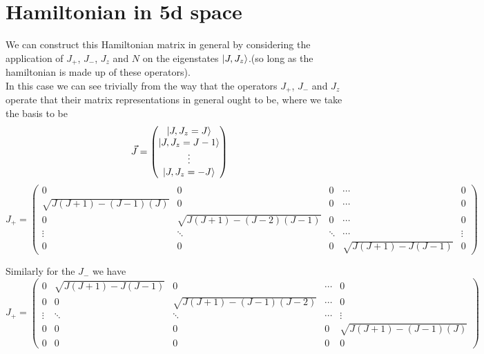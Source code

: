 \documentclass[11pt]{article} %
\begin{document}
\section{Hamiltonian in 5d space}

We can construct this Hamiltonian matrix in general by considering the application of $J_+$, $J_-$, $J_z$ and $N$ on the eigenstates $\ket{J,J_z}$.(so long as the hamiltonian is made up of these operators).\\


In this case we can see trivially from the way that the operators $J_+$, $J_-$ and $J_z$ operate that their matrix representations in general ought to be, where we take the basis to be \\
\begin{equation}
\vec{J}=\begin{pmatrix} \ket{J,J_z=J} \\ \ket{J,J_z=J-1} \\ \vdots \\ \ket{J,J_z=-J} \end{pmatrix}\end{equation}
\begin{equation}
J_+=\begin{pmatrix} 0 & 0 & 0 & \cdots & 0 \\
\sqrt{J(J+1)-(J-1)(J)} & 0 & 0 & \cdots & 0 \\
0& \sqrt{J(J+1)-(J-2)(J-1)}  & 0 & \cdots & 0 \\
\vdots & \ddots  & \ddots  & \cdots & \vdots\\
0 & 0 & 0 & \sqrt{J(J+1)-J(J-1)}& 0 

 \end{pmatrix}
\end{equation}  


Similarly for the $J_-$ we have\\

\begin{equation}
J_+=\begin{pmatrix} 0 & \sqrt{J(J+1)-J(J-1)} & 0 & \cdots & 0 \\
0 & 0 & \sqrt{J(J+1)-(J-1)(J-2)} & \cdots & 0 \\
\vdots & \ddots  & \ddots  & \cdots & \vdots\\
0 & 0 & 0 & 0 & \sqrt{J(J+1)-(J-1)(J)}\\
0 & 0 & 0 & 0& 0 

 \end{pmatrix}
\end{equation}  
\end{document}
